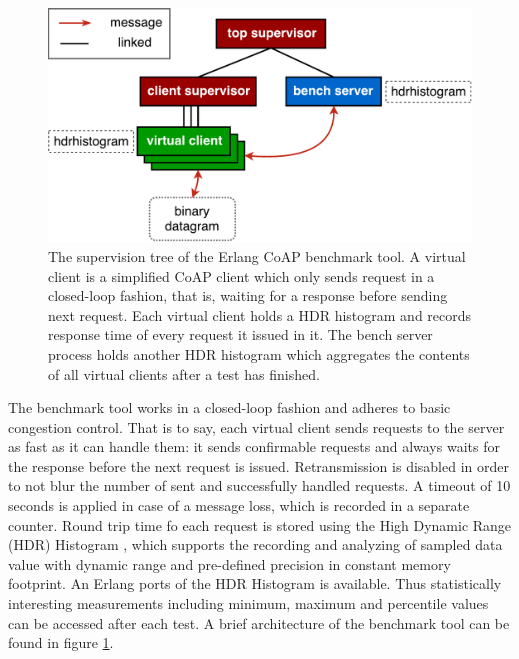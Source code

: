 \begin{figure}[!htbp]
\centering
\includegraphics[scale = 0.55]{ecoap_bench_arch}
\caption[The supervision tree of the Erlang CoAP benchmark tool]{The supervision tree of the Erlang CoAP benchmark tool. A virtual client is a simplified CoAP client which only sends request in a closed-loop fashion, that is, waiting for a response before sending next request. Each virtual client holds a HDR histogram and records response time of every request it issued in it. The bench server process holds another HDR histogram which aggregates the contents of all virtual clients after a test has finished.}
\label{fig:ecoap_bench_arch}
\end{figure}

The benchmark tool works in a closed-loop fashion and adheres to basic congestion control. That is to say, each virtual client sends requests to the server as fast as it can handle them: it sends confirmable requests and always waits for the response before the next request is issued. Retransmission is disabled in order to not blur the number of sent and successfully handled requests. A timeout of 10 seconds is applied in case of a message loss, which is recorded in a separate counter. Round trip time fo each request is stored using the High Dynamic Range (HDR) Histogram \cite{hdr_erl}, which supports the recording and analyzing of sampled data value with dynamic range and pre-defined precision in constant memory footprint. An Erlang ports of the HDR Histogram is available. Thus statistically interesting measurements including minimum, maximum and percentile values can be accessed after each test. A brief architecture of the benchmark tool can be found in figure \ref{fig:ecoap_bench_arch}.


